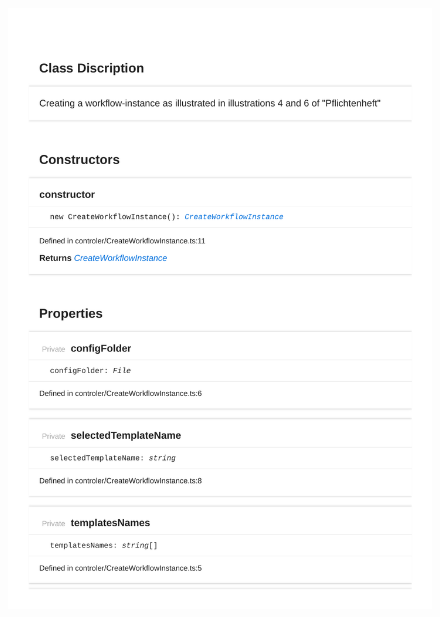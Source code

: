 \begin{figure}[H]
\centerline{\includegraphics[width=1\textwidth]{FrontendDocsAsPDF/Model/CreateWorkflowInstance.pdf}}
\end{figure}

